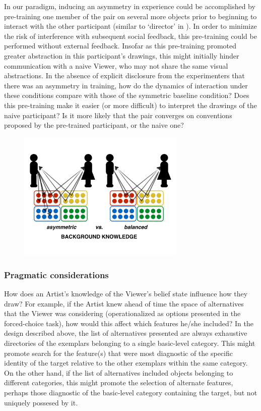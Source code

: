 \documentclass[12pt]{article}
\begin{document}
In our paradigm, inducing an asymmetry in experience could be accomplished by pre-training one member of the pair on several more objects prior to beginning to interact with the other participant (similar to `director' in ). In order to minimize the risk of interference with subsequent social feedback, this pre-training could be performed without external feedback. Insofar as this pre-training promoted greater abstraction in this participant's drawings, this might initially hinder communication with a naive Viewer, who may not share the same visual abstractions. In the absence of explicit disclosure from the experimenters that there was an asymmetry in training, how do the dynamics of interaction under these conditions compare with those of the symmetric baseline condition? Does this pre-training make it easier (or more difficult) to interpret the drawings of the naive participant? Is it more likely that the pair converges on conventions proposed by the pre-trained participant, or the naive one? 

\begin{figure}[hbtp]
\begin{center}
\includegraphics[width=80mm]{figures/background_knowledge.pdf}
\end{center}
\end{figure}
\vspace{-5mm}

\subsubsection{Pragmatic considerations} How does an Artist's knowledge of the Viewer's belief state influence how they draw? For example, if the Artist knew ahead of time the space of alternatives that the Viewer was considering (operationalized as options presented in the forced-choice task), how would this affect which features he/she included? In the design described above, the list of alternatives presented are always exhaustive directories of the exemplars belonging to a single basic-level category. This might promote search for the feature(s) that were most diagnostic of the specific identity of the target relative to the other exemplars within the same category. On the other hand, if the list of alternatives included objects belonging to different categories, this might promote the selection of alternate features, perhaps those diagnostic of the basic-level category containing the target, but not uniquely possesed by it. 
\end{document}
